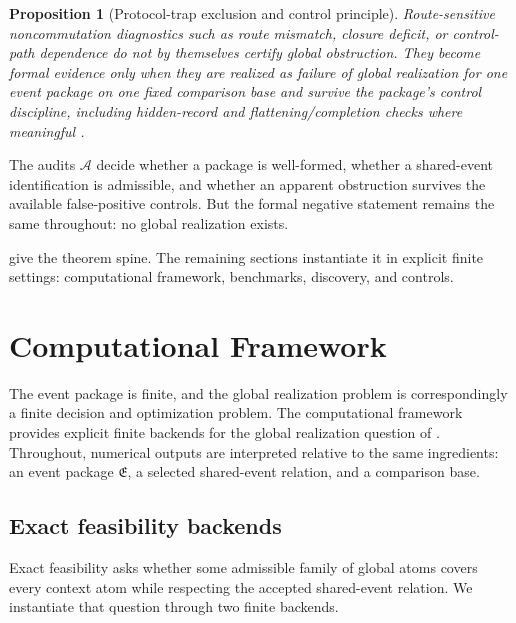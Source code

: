 \documentclass[11pt]{article}
\newcommand{\EventPackage}{\mathfrak{E}}
\newtheorem{proposition}[theorem]{Proposition}
\theoremstyle{definition}
\begin{document}
\begin{proposition}[Protocol-trap exclusion and control principle]\label{prop:protocol-trap-exclusion}
Route-sensitive noncommutation diagnostics such as route mismatch, closure deficit, or control-path dependence do not by themselves certify global obstruction. They become formal evidence only when they are realized as failure of global realization for one event package on one fixed comparison base and survive the package's control discipline, including hidden-record and flattening/completion checks where meaningful \citep{Tsiokos2026NoGo,Tsiokos2026ProtocolTrap}.
\end{proposition}

The audits \(\mathcal A\) decide whether a package is well-formed, whether a shared-event identification is admissible, and whether an apparent obstruction survives the available false-positive controls. But the formal negative statement remains the same throughout: no global realization exists.

 give the theorem spine. The remaining sections instantiate it in explicit finite settings: computational framework, benchmarks, discovery, and controls.

\section{Computational Framework}\label{sec:computational-framework}
The event package is finite, and the global realization problem is correspondingly a finite decision and optimization problem. The computational framework provides explicit finite backends for the global realization question of . Throughout, numerical outputs are interpreted relative to the same ingredients: an event package \(\EventPackage\), a selected shared-event relation, and a comparison base.

\subsection{Exact feasibility backends}

Exact feasibility asks whether some admissible family of global atoms covers every context atom while respecting the accepted shared-event relation. We instantiate that question through two finite backends.
\end{document}
